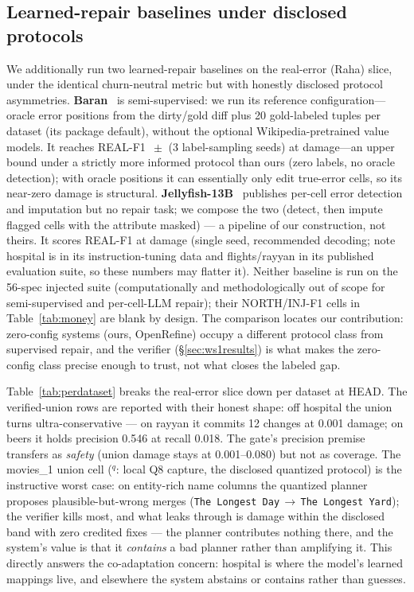 \documentclass[11pt]{article}
\begin{document}
\subsection{Learned-repair baselines under disclosed protocols}
\label{sec:ws4}
We additionally run two learned-repair baselines on the real-error (Raha) slice,
under the identical churn-neutral metric but with honestly disclosed protocol
asymmetries. \textbf{Baran}~\cite{raha} is semi-supervised: we run its reference
configuration---oracle error positions from the dirty/gold diff plus 20 gold-labeled
tuples per dataset (its package default), without the optional Wikipedia-pretrained
value models. It reaches REAL-F1 \realFBaran{}$\,\pm$\realFBaranCI{} (3 label-sampling
seeds) at \damageBaran{} damage---an upper bound under a strictly more informed
protocol than ours (zero labels, no oracle detection); with oracle positions it can
essentially only edit true-error cells, so its near-zero damage is structural.
\textbf{Jellyfish-13B}~\cite{jellyfish} publishes per-cell error detection and
imputation but no repair task; we compose the two (detect, then impute flagged cells
with the attribute masked) --- a pipeline of our construction, not theirs. It scores
REAL-F1 \realFJelly{} at \damageJelly{} damage (single seed, recommended decoding;
note hospital is in its instruction-tuning data and flights/rayyan in its published
evaluation suite, so these numbers may flatter it). Neither baseline is run on the
56-spec injected suite (computationally and methodologically out of scope for
semi-supervised and per-cell-LLM repair); their NORTH/INJ-F1 cells in
Table~\ref{tab:money} are blank by design. The comparison locates our contribution:
zero-config systems (ours, OpenRefine) occupy a different protocol class from
supervised repair, and the verifier (\S\ref{sec:ws1results}) is what makes the
zero-config class precise enough to trust, not what closes the labeled gap.

Table~\ref{tab:perdataset} breaks the real-error slice down per dataset at HEAD.
The verified-union rows are reported with their honest shape: off hospital the
union turns ultra-conservative --- on rayyan it commits 12 changes at 0.001
damage; on beers it holds precision 0.546 at recall 0.018. The gate's precision
premise transfers as \emph{safety} (union damage stays at 0.001--0.080) but not
as coverage. The movies\_1 union cell ($^{q}$: local Q8 capture, the disclosed
quantized protocol) is the instructive worst case: on entity-rich name columns
the quantized planner proposes plausible-but-wrong merges
(\texttt{The Longest Day}$\,\to\,$\texttt{The Longest Yard}); the verifier kills
most, and what leaks through is damage within the disclosed band with zero
credited fixes --- the planner contributes nothing there, and the system's value
is that it \emph{contains} a bad planner rather than amplifying it. This directly
answers the co-adaptation concern: hospital is where the model's learned mappings
live, and elsewhere the system abstains or contains rather than guesses.
\end{document}
